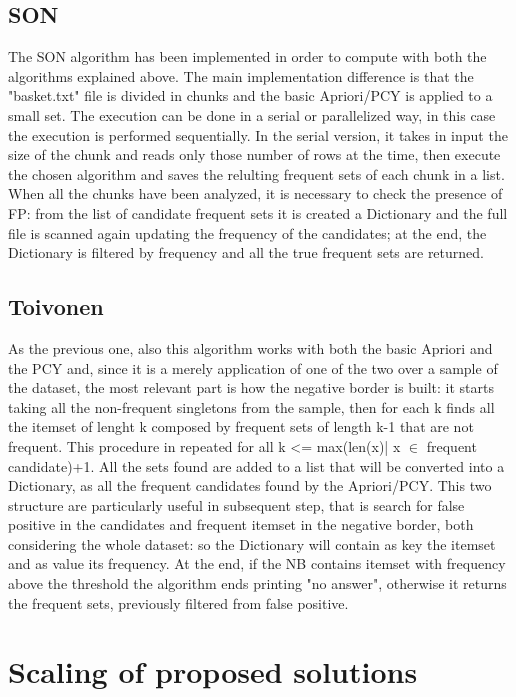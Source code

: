 \documentclass[14pt]{extarticle}
\begin{document}
\subsection{SON}
The SON algorithm has been implemented in order to compute with both the algorithms explained above. The main implementation difference is that the "basket.txt" file is divided in chunks and the basic Apriori/PCY is applied to a small set. The execution can be done in a serial or parallelized way, in this case the execution is performed sequentially. In the serial version, it takes in input the size of the chunk and reads only those number of rows at the time, then execute the chosen algorithm and saves the relulting frequent sets of each chunk in a list. When all the chunks have been analyzed, it is necessary to check the presence of FP: from the list of candidate frequent sets it is created a Dictionary and the full file is scanned again updating the frequency of the candidates; at the end, the Dictionary is filtered by frequency and all the true frequent sets are returned.

\subsection{Toivonen}
As the previous one, also this algorithm works with both the basic Apriori and the PCY and, since it is a merely application of one of the two over a sample of the dataset, the most relevant part is how the negative border is built: it starts taking all the non-frequent singletons from the sample, then for each k finds all the itemset of lenght k composed by frequent sets of length k-1 that are not frequent. This procedure in repeated for all k <= max(len(x)| x $\in$ {frequent candidate})+1. All the sets found are added to a list that will be converted into a Dictionary, as all the frequent candidates found by the Apriori/PCY. This two structure are particularly useful in subsequent step, that is search for false positive in the candidates and frequent itemset in the negative border, both considering the whole dataset: so the Dictionary will contain as key the itemset and as value its frequency.
At the end, if the NB contains itemset with frequency above the threshold the algorithm ends printing "no answer", otherwise it returns the frequent sets, previously filtered from false positive.

\section{Scaling of proposed solutions}
\end{document}
